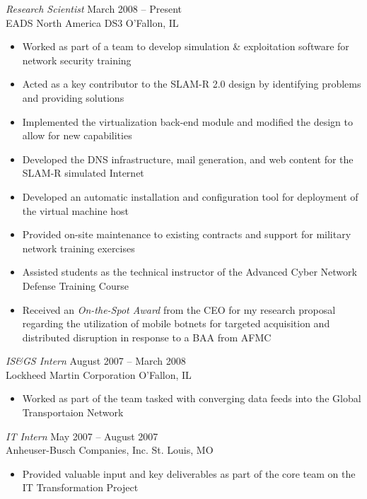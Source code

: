\documentclass[margin,line]{resume}
\begin{document}
\begin{resume}
{\sl Research Scientist}            \hfill  March 2008 -- Present\\
EADS North America DS3              \hfill  O'Fallon, IL
\begin{itemize} \itemsep -2pt %
\small\item Worked as part of a team to develop simulation \& exploitation software for network security training
\small\item Acted as a key contributor to the SLAM-R 2.0 design by identifying problems and providing solutions
\small\item Implemented the virtualization back-end module and modified the design to allow for new capabilities
\small\item Developed the DNS infrastructure, mail generation, and web content for the SLAM-R simulated Internet
\small\item Developed an automatic installation and configuration tool for deployment of the virtual machine host 
\small\item Provided on-site maintenance to existing contracts and support for military network training exercises
\small\item Assisted students as the technical instructor of the Advanced Cyber Network Defense Training Course
\small\item Received an {\sl On-the-Spot Award} from the CEO for my research proposal regarding the utilization of
            mobile botnets for targeted acquisition and distributed disruption in response to a BAA from AFMC

\end{itemize}

{\sl IS\&GS Intern}                 \hfill  August 2007 -- March 2008\\
Lockheed Martin Corporation         \hfill  O'Fallon, IL
\begin{itemize} \itemsep -2pt %
\small\item Worked as part of the team tasked with converging data feeds into the Global Transportaion Network
\end{itemize}

{\sl IT Intern}                     \hfill  May 2007 -- August 2007\\
Anheuser-Busch Companies, Inc.      \hfill  St. Louis, MO
\begin{itemize} \itemsep -2pt %
\small\item Provided valuable input and key deliverables as part of the core team on the IT Transformation Project
\end{itemize}


\end{resume}
\end{document}
